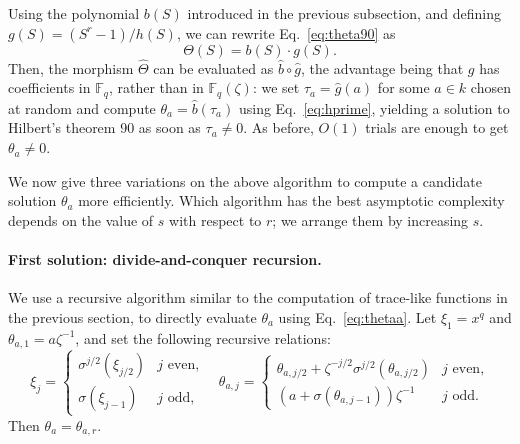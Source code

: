 \documentclass[12pt]{article}
\theoremstyle{plain}
\theoremstyle{definition}
\def\F{\ensuremath{\mathbb{F}}}
\newcounter{algorithm}
\begin{document}
Using the polynomial $b(S)$ introduced in the previous subsection,
and defining
$g(S)=(S^r-1)/h(S)$, we can rewrite Eq.~\eqref{eq:theta90} as
\begin{equation}
  \label{eq:theta90bis}
  \Theta(S) = b(S) \cdot g(S).
\end{equation}
Then, the morphism $\hat\Theta$ can be evaluated
as $\hat{b}\circ\hat{g}$, the advantage being that $g$ has
coefficients in $\F_q$, rather than in $\F_q(\zeta)$: we set $\tau_a = \hat{g}(a)$ for some $a\in k$ chosen at random
and compute $\theta_a = \hat{b}(\tau_a)$ using Eq.~\eqref{eq:hprime},
yielding a solution to Hilbert's theorem 90 as soon as $\tau_a \neq 0$.
As before, $O(1)$ trials are enough to get $\theta_a \neq 0$.



We now give three variations on the above algorithm to compute 
a candidate solution $\theta_a$ more efficiently.
Which algorithm has the best asymptotic complexity depends on the
value of $s$ with respect to $r$; we arrange them by increasing $s$.



\paragraph{First solution: divide-and-conquer recursion.}
We use a recursive algorithm similar to the computation of trace-like
functions in the previous section, to directly evaluate $\theta_a$
using Eq.~\eqref{eq:thetaa}.  Let $\xi_1=x^q$ and
$\theta_{a,1}=a\zeta^{-1}$, and set the following recursive relations:
\begin{equation}
\label{eq:theta-recursive}
\xi_j = 
\begin{cases}
\sigma^{j/2}(\xi_{j / 2}) & j \text{ even,} \\
\sigma(\xi_{j - 1}) & j \text{ odd,}
\end{cases} \quad
\theta_{a, j} = 
\begin{cases}
\theta_{a, j / 2} + \zeta^{-j / 2}\sigma^{j / 2}(\theta_{a, j / 2})& j \text{ even,} \\
(a + \sigma(\theta_{a, j - 1}))\zeta^{-1} & j \text{ odd.}
\end{cases}
\end{equation}
Then $\theta_a=\theta_{a,r}$.
\end{document}
